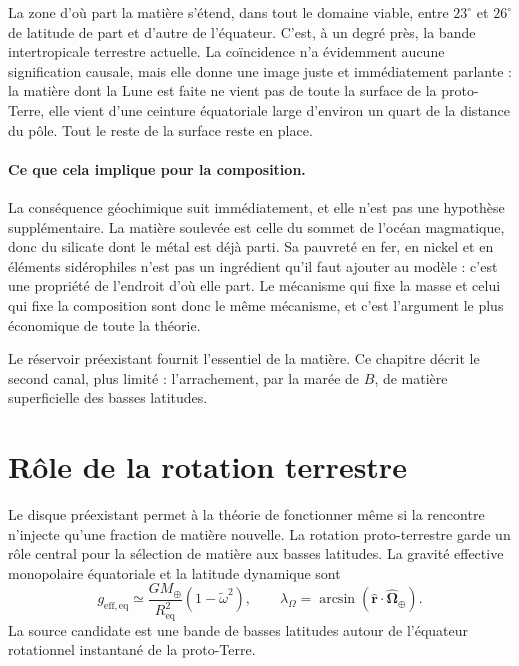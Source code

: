 \documentclass[11pt,a4paper,openany]{report}
\newcommand{\Mt}{M_{\oplus}}
\newcommand{\Req}{R_{\mathrm{eq}}}
\begin{document}
\begin{ideephys}
La zone d'où part la matière s'étend, dans tout le domaine viable, entre $23^\circ$ et $26^\circ$
de latitude de part et d'autre de l'équateur. C'est, à un degré près, la bande intertropicale
terrestre actuelle. La coïncidence n'a évidemment aucune signification causale, mais elle donne une
image juste et immédiatement parlante : la matière dont la Lune est faite ne vient pas de toute la
surface de la proto-Terre, elle vient d'une ceinture équatoriale large d'environ un quart de la
distance du pôle. Tout le reste de la surface reste en place.
\end{ideephys}

\paragraph{Ce que cela implique pour la composition.} La conséquence géochimique suit
immédiatement, et elle n'est pas une hypothèse supplémentaire. La matière soulevée est celle du
sommet de l'océan magmatique, donc du silicate dont le métal est déjà parti. Sa pauvreté en fer, en
nickel et en éléments sidérophiles n'est pas un ingrédient qu'il faut ajouter au modèle : c'est une
propriété de l'endroit d'où elle part. Le mécanisme qui fixe la masse et celui qui fixe la
composition sont donc le même mécanisme, et c'est l'argument le plus économique de toute la
théorie.


Le réservoir préexistant fournit l'essentiel de la matière. Ce chapitre décrit le second canal, plus
limité : l'arrachement, par la marée de $B$, de matière superficielle des basses latitudes.

\section{Rôle de la rotation terrestre}

Le disque préexistant permet à la théorie de fonctionner même si la rencontre n'injecte qu'une
fraction de matière nouvelle. La rotation proto-terrestre garde un rôle central pour la sélection
de matière aux basses latitudes. La gravité effective monopolaire équatoriale et la latitude
dynamique sont
\begin{equation}
g_{\mathrm{eff,eq}}\simeq\frac{G\Mt}{\Req^2}\left(1-\tilde\omega^2\right),
\qquad
\lambda_\Omega=\arcsin\!\left(\hat{\mathbf{r}}\cdot\hat{\boldsymbol{\Omega}}_\oplus\right).
\label{eq:geff}
\end{equation}
La source candidate est une bande de basses latitudes autour de l'équateur rotationnel
instantané de la proto-Terre.
\end{document}
